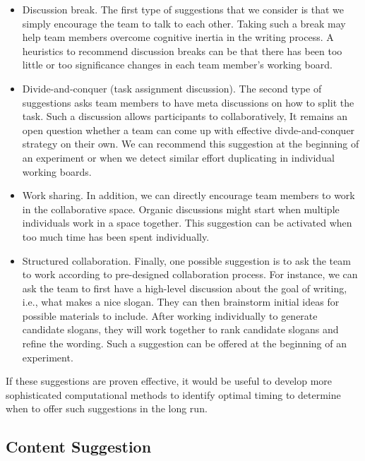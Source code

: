 \begin{itemize}
    \item Discussion break. The first type of suggestions that we consider is that we simply encourage the team to talk to each other.
    Taking such a break may help team members overcome cognitive inertia in the writing process.
    A heuristics to recommend discussion breaks can be that there has been too little or too significance changes in each team member's working board.
    \item Divide-and-conquer (task assignment discussion).
    The second type of suggestions asks team members to have meta discussions on how to split the task.
    Such a discussion allows participants to collaboratively,
    It remains an open question whether a team can come up with effective divde-and-conquer strategy on their own.
    We can recommend this suggestion at the beginning of an experiment or when we detect similar effort duplicating in individual working boards.
    \item Work sharing. In addition, we can directly encourage team members to work in the collaborative space.
    Organic discussions might start when multiple individuals work in a space together.
    This suggestion can be activated when too much time has been spent individually.
    \item Structured collaboration.
    Finally, one possible suggestion is to ask the team to work according to pre-designed collaboration process.
    For instance, we can ask the team to first have a high-level discussion about the goal of writing, i.e., what makes a nice slogan.
    They can then brainstorm initial ideas for possible materials to include.
    After working individually to generate candidate slogans, they will work together to rank candidate slogans and refine the wording.
    Such a suggestion can be offered at the beginning of an experiment.
\end{itemize}

If these suggestions are proven effective, it would be useful to develop more sophisticated computational methods to identify optimal timing to determine when to offer such suggestions in the long run.

\subsection{Content Suggestion}
\label{sec:content}

